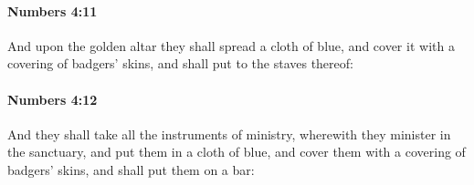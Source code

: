 		\paragraph{Numbers 4:11} %
			\label{NUMBERS-4-11}

			And upon the golden altar they shall spread a cloth of blue, and cover it with a covering of badgers’ skins, and shall put to the staves thereof:


		\paragraph{Numbers 4:12} %
			\label{NUMBERS-4-12}

			And they shall take all the instruments of ministry, wherewith they minister in the sanctuary, and put them in a cloth of blue, and cover them with a covering of badgers’ skins, and shall put them on a bar:


